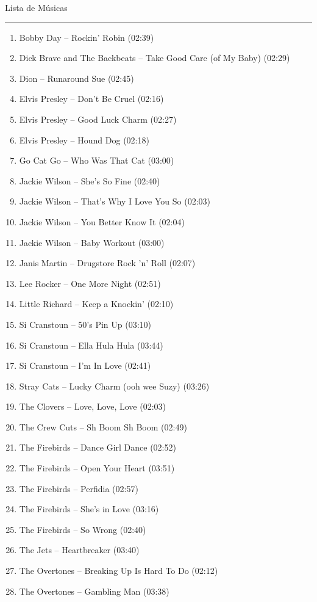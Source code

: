 \documentclass{article}
\begin{document}
\begin{minipage}[t][0.95\textheight][t]{0.477\textwidth}
    \centering
    \vspace{0.1cm}
    {\Large Lista de Músicas}\\
    \rule{\textwidth}{1pt}
    \scriptsize
    \begin{enumerate}
        \setlength\itemsep{1mm}
        \item Bobby Day -- Rockin' Robin (02:39)
        \item Dick Brave and The Backbeats -- Take Good Care (of My Baby) (02:29)
        \item Dion -- Runaround Sue (02:45)
        \item Elvis Presley -- Don't Be Cruel (02:16)
        \item Elvis Presley -- Good Luck Charm (02:27)
        \item Elvis Presley -- Hound Dog (02:18)
        \item Go Cat Go -- Who Was That Cat (03:00)
        \item Jackie Wilson -- She's So Fine (02:40)
        \item Jackie Wilson -- That's Why I Love You So (02:03)
        \item Jackie Wilson -- You Better Know It (02:04)
        \item Jackie Wilson -- Baby Workout (03:00)
        \item Janis Martin -- Drugstore Rock 'n' Roll (02:07)
        \item Lee Rocker -- One More Night (02:51)
        \item Little Richard -- Keep a Knockin' (02:10)
        \item Si Cranstoun -- 50's Pin Up (03:10)
        \item Si Cranstoun -- Ella Hula Hula (03:44)
        \item Si Cranstoun -- I'm In Love (02:41)
        \item Stray Cats -- Lucky Charm (ooh wee Suzy) (03:26)
        \item The Clovers -- Love, Love, Love (02:03)
        \item The Crew Cuts -- Sh Boom Sh Boom (02:49)
        \item The Firebirds -- Dance Girl Dance (02:52)
        \item The Firebirds -- Open Your Heart (03:51)
        \item The Firebirds -- Perfidia (02:57)
        \item The Firebirds -- She's in Love (03:16)
        \item The Firebirds -- So Wrong (02:40)
        \item The Jets -- Heartbreaker (03:40)
        \item The Overtones -- Breaking Up Is Hard To Do (02:12)
        \item The Overtones -- Gambling Man (03:38)
    \end{enumerate}
\end{minipage}
\end{document}
